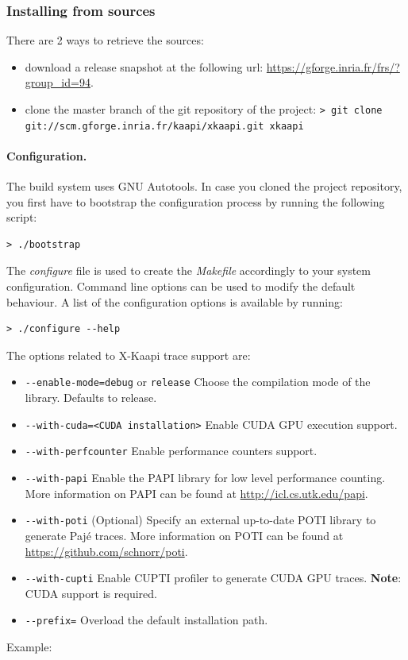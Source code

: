 \documentclass{article}[12pt]
\newcommand{\kaapi}{\textsc{X}-Kaapi\xspace}
\begin{document}
\subsubsection*{Installing from sources}

There are 2 ways to retrieve the sources:
\begin{itemize}
\item download a release snapshot at the following url:\newline
\url{https://gforge.inria.fr/frs/?group_id=94}.
\item clone the master branch of the git repository of the project:\newline
\verb+> git clone git://scm.gforge.inria.fr/kaapi/xkaapi.git xkaapi+
\end{itemize}


\paragraph{Configuration.}
The build system uses GNU Autotools.
In case you cloned the project repository, you first have to bootstrap the
configuration process by running the following script:
\begin{verbatim}
> ./bootstrap
\end{verbatim}
The \textit{configure} file is used to create the
\textit{Makefile} accordingly to your system configuration. Command line
options can be used to modify the default behaviour. A list of the
configuration options is available by running:
\begin{verbatim}
> ./configure --help
\end{verbatim}

The options related to \kaapi trace support are:
\begin{itemize} %
\item \verb+--enable-mode=debug+ or \verb+release+\newline
Choose the compilation mode of the library. Defaults to release.
\item \verb+--with-cuda=<CUDA installation>+\newline
Enable CUDA GPU execution support.
\item \verb+--with-perfcounter+\newline
Enable performance counters support.
\item \verb+--with-papi+\newline
Enable the PAPI library for low level performance counting.
More information on PAPI can be found at \url{http://icl.cs.utk.edu/papi}.
\item \verb+--with-poti+\newline
(Optional) Specify an external up-to-date POTI library to generate Paj\'e traces.
More information on POTI can be found at \url{https://github.com/schnorr/poti}. 
\item \verb+--with-cupti+\newline
Enable CUPTI profiler to generate CUDA GPU traces. 
\textbf{Note}: CUDA support is required.
\item \verb+--prefix=+\newline
Overload the default installation path.
\end{itemize} %
Example:
\end{document}
